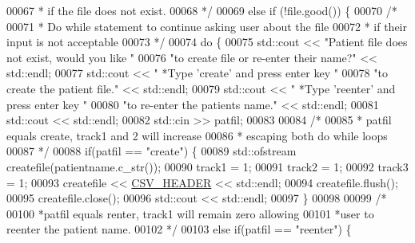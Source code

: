 \begin{DoxyCode}
00067 \textcolor{comment}{             * if the file does not exist.}
00068 \textcolor{comment}{             */}
00069             \textcolor{keywordflow}{else} \textcolor{keywordflow}{if} (!file.good()) \{
00070                 \textcolor{comment}{/* }
00071 \textcolor{comment}{                 * Do while statement to continue asking user about the file}
00072 \textcolor{comment}{                 * if their input is not acceptable}
00073 \textcolor{comment}{                 */} 
00074                 \textcolor{keywordflow}{do} \{
00075                     std::cout << \textcolor{stringliteral}{"Patient file does not exist, would you like "}
00076                         \textcolor{stringliteral}{"to create file or re-enter their name?"} << std::endl;
00077                     std::cout << \textcolor{stringliteral}{"  *Type 'create' and press enter key "}
00078                         \textcolor{stringliteral}{"to create the patient file."} << std::endl;
00079                     std::cout << \textcolor{stringliteral}{"  *Type 'reenter' and press enter key "}
00080                         \textcolor{stringliteral}{"to re-enter the patients name."} << std::endl;
00081                     std::cout << std::endl;
00082                     std::cin >> patfil;
00083 
00084                     \textcolor{comment}{/* }
00085 \textcolor{comment}{                     * patfil equals create, track1 and 2 will increase}
00086 \textcolor{comment}{                     * escaping both do while loops}
00087 \textcolor{comment}{                     */}
00088                     \textcolor{keywordflow}{if}(patfil == \textcolor{stringliteral}{"create"}) \{
00089                         std::ofstream createfile(patientname.c\_str());
00090                         track1 = 1;
00091                         track2 = 1;
00092                         track3 = 1;
00093                         createfile << \hyperlink{definitions_8hpp_ac686b5c4edb9968dade15aad6e58bdca}{CSV\_HEADER} << std::endl;
00094                         createfile.flush();
00095                         createfile.close();
00096                         std::cout << std::endl;
00097                     \}
00098 
00099                     \textcolor{comment}{/*}
00100 \textcolor{comment}{                     *patfil equals renter, track1 will remain zero allowing}
00101 \textcolor{comment}{                     *user to reenter the patient name.}
00102 \textcolor{comment}{                     */}
00103                     \textcolor{keywordflow}{else} \textcolor{keywordflow}{if}(patfil == \textcolor{stringliteral}{"reenter"}) \{

\end{DoxyCode}
